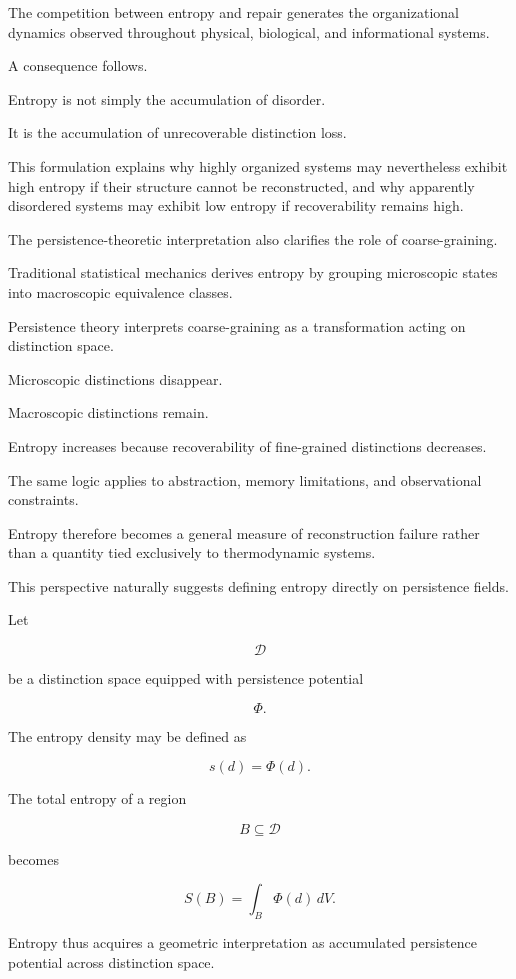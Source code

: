 \documentclass[12pt,oneside]{article}
\theoremstyle{definition}
\begin{document}
The competition between entropy and repair generates the organizational dynamics observed throughout physical, biological, and informational systems.

A consequence follows.

Entropy is not simply the accumulation of disorder.

It is the accumulation of unrecoverable distinction loss.

This formulation explains why highly organized systems may nevertheless exhibit high entropy if their structure cannot be reconstructed, and why apparently disordered systems may exhibit low entropy if recoverability remains high.

The persistence-theoretic interpretation also clarifies the role of coarse-graining.

Traditional statistical mechanics derives entropy by grouping microscopic states into macroscopic equivalence classes.

Persistence theory interprets coarse-graining as a transformation acting on distinction space.

Microscopic distinctions disappear.

Macroscopic distinctions remain.

Entropy increases because recoverability of fine-grained distinctions decreases.

The same logic applies to abstraction, memory limitations, and observational constraints.

Entropy therefore becomes a general measure of reconstruction failure rather than a quantity tied exclusively to thermodynamic systems.

This perspective naturally suggests defining entropy directly on persistence fields.

Let

\[
\mathcal D
\]

be a distinction space equipped with persistence potential

\[
\Phi.
\]

The entropy density may be defined as

\[
s(d)
=
\Phi(d).
\]

The total entropy of a region

\[
B
\subseteq
\mathcal D
\]

becomes

\[
S(B)
=
\int_B
\Phi(d)
\,dV.
\]

Entropy thus acquires a geometric interpretation as accumulated persistence potential across distinction space.
\end{document}
